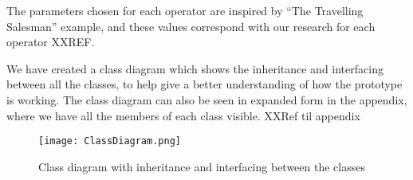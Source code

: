 The parameters chosen for each operator are inspired by “The Travelling Salesman” example, and these values correspond with our research for each operator XXREF.


We have created a class diagram which shows the inheritance and interfacing between all the classes, to help give a better understanding of how the prototype is working. The class diagram can also be seen in expanded form in the appendix, where we have all the members of each class visible. XXRef til appendix

\begin{figure}[!htbp]
	\centering
	\texttt{[image: ClassDiagram.png]}
	\caption{Class diagram with inheritance and interfacing between the classes}
	\label{fig:class}
\end{figure}

